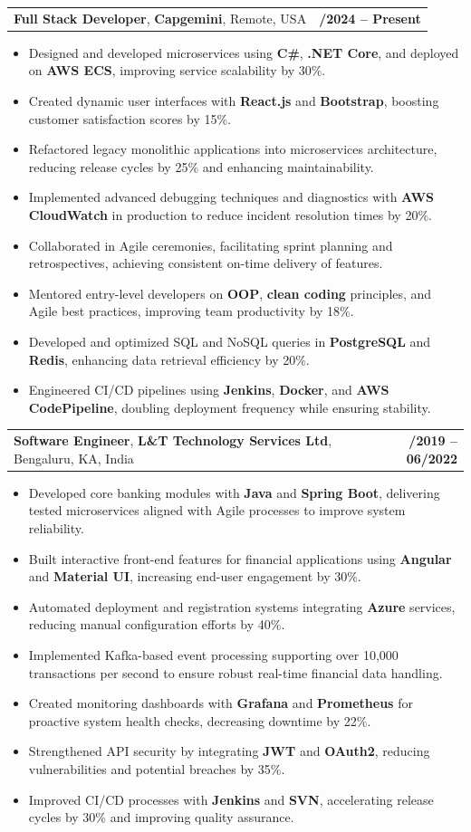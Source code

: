 \documentclass[letterpaper,11pt]{article}
\makeatletter
\newcommand{\resumeItem}[1]{
  \item\footnotesize{
    {#1 \vspace{-2pt}}
  }
}
\newcommand{\resumeSubheading}[4]{
  \vspace{-2pt}\item
    \begin{tabular*}{1.0\textwidth}[t]{l@{\extracolsep{\fill}}r}
      \textbf{\fontsize{10pt}{14pt}\selectfont #3}, \textbf{\fontsize{10pt}{14pt}\selectfont #1}, \fontsize{10pt}{14pt}\selectfont #4 & \textbf{\fontsize{10pt}{14pt}\selectfont #2} \\
    \end{tabular*}\vspace{-7pt}
}
\newcommand{\resumeItemListStart}{\begin{itemize}[leftmargin=*]}
\newcommand{\resumeItemListEnd}{\end{itemize}\vspace{-5pt}}
\makeatother
\begin{document}
    \resumeSubheading
        {Capgemini}{01/2024 -- Present}
        {Full Stack Developer}{Remote, USA}
      \resumeItemListStart
        \resumeItem{Designed and developed microservices using \textbf{C\#}, \textbf{.NET Core}, and deployed on \textbf{AWS ECS}, improving service scalability by 30\%.}
        \resumeItem{Created dynamic user interfaces with \textbf{React.js} and \textbf{Bootstrap}, boosting customer satisfaction scores by 15\%.}
        \resumeItem{Refactored legacy monolithic applications into microservices architecture, reducing release cycles by 25\% and enhancing maintainability.}
        \resumeItem{Implemented advanced debugging techniques and diagnostics with \textbf{AWS CloudWatch} in production to reduce incident resolution times by 20\%.}
        \resumeItem{Collaborated in Agile ceremonies, facilitating sprint planning and retrospectives, achieving consistent on-time delivery of features.}
        \resumeItem{Mentored entry-level developers on \textbf{OOP}, \textbf{clean coding} principles, and Agile best practices, improving team productivity by 18\%.}
        \resumeItem{Developed and optimized SQL and NoSQL queries in \textbf{PostgreSQL} and \textbf{Redis}, enhancing data retrieval efficiency by 20\%.}
        \resumeItem{Engineered CI/CD pipelines using \textbf{Jenkins}, \textbf{Docker}, and \textbf{AWS CodePipeline}, doubling deployment frequency while ensuring stability.}
      \resumeItemListEnd

    \resumeSubheading
        {L\&T Technology Services Ltd}{08/2019 -- 06/2022}
        {Software Engineer}{Bengaluru, KA, India}
      \resumeItemListStart
        \resumeItem{Developed core banking modules with \textbf{Java} and \textbf{Spring Boot}, delivering tested microservices aligned with Agile processes to improve system reliability.}
        \resumeItem{Built interactive front-end features for financial applications using \textbf{Angular} and \textbf{Material UI}, increasing end-user engagement by 30\%.}
        \resumeItem{Automated deployment and registration systems integrating \textbf{Azure} services, reducing manual configuration efforts by 40\%.}
        \resumeItem{Implemented Kafka-based event processing supporting over 10,000 transactions per second to ensure robust real-time financial data handling.}
        \resumeItem{Created monitoring dashboards with \textbf{Grafana} and \textbf{Prometheus} for proactive system health checks, decreasing downtime by 22\%.}
        \resumeItem{Strengthened API security by integrating \textbf{JWT} and \textbf{OAuth2}, reducing vulnerabilities and potential breaches by 35\%.}
        \resumeItem{Improved CI/CD processes with \textbf{Jenkins} and \textbf{SVN}, accelerating release cycles by 30\% and improving quality assurance.}
      \resumeItemListEnd
\end{document}
